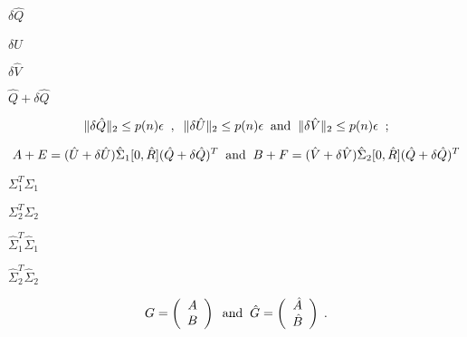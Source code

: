 {\newpage\clearpage
{}%
$\delta \hat{Q}$%
\lthtmlinlinemathZ
\lthtmlcheckvsize\clearpage}

{\newpage\clearpage
{}%
$\delta \hat{U}$%
\lthtmlinlinemathZ
\lthtmlcheckvsize\clearpage}

{\newpage\clearpage
{}%
$\delta \hat{V}$%
\lthtmlinlinemathZ
\lthtmlcheckvsize\clearpage}

{\newpage\clearpage
{}%
$\hat{Q} + \delta \hat{Q}$%
\lthtmlinlinemathZ
\lthtmlcheckvsize\clearpage}

{\newpage\clearpage
{}%
\begin{displaymath}
\| \delta \hat{Q} \|_2 \leq p(n) \epsilon \; \; , \; \;
\| \delta \hat{U} \|_2 \leq p(n) \epsilon \; \; {\rm and} \; \;
\| \delta \hat{V} \|_2 \leq p(n) \epsilon \; \; ;
\end{displaymath}%
\lthtmldisplayZ
\lthtmlcheckvsize\clearpage}

{\newpage\clearpage
{}%
\begin{displaymath}
A + E = ( \hat{U} + \delta \hat{U} ) \hat{\Sigma}_1 [ 0, \hat{R}] (\hat{Q} + \delta \hat{Q})^T
\; \; {\rm and} \; \;
B + F = ( \hat{V} + \delta \hat{V} ) \hat{\Sigma}_2 [ 0, \hat{R}] (\hat{Q} + \delta \hat{Q})^T
\end{displaymath}%
\lthtmldisplayZ
\lthtmlcheckvsize\clearpage}

{\newpage\clearpage
{}%
$\Sigma_1^T \Sigma_1$%
\lthtmlinlinemathZ
\lthtmlcheckvsize\clearpage}

{\newpage\clearpage
{}%
$\Sigma_2^T \Sigma_2$%
\lthtmlinlinemathZ
\lthtmlcheckvsize\clearpage}

{\newpage\clearpage
{}%
$\hat{\Sigma}_1^T \hat{\Sigma}_1$%
\lthtmlinlinemathZ
\lthtmlcheckvsize\clearpage}

{\newpage\clearpage
{}%
$\hat{\Sigma}_2^T \hat{\Sigma}_2$%
\lthtmlinlinemathZ
\lthtmlcheckvsize\clearpage}

{\newpage\clearpage
{}%
\begin{displaymath}
G = \left( \begin{array}{c} A \\B \end{array} \right) \; \; {\rm and} \; \; \hat{G} = \left( \begin{array}{c} \hat{A} \\\hat{B} \end{array} \right) \; .
\end{displaymath}%
\lthtmldisplayZ
\lthtmlcheckvsize\clearpage}

